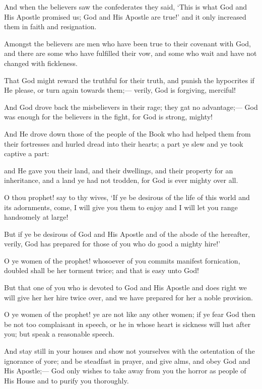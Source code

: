 \documentclass[fontsize=14pt, letterpaper, notitlepage, openany, DIV=12]{scrbook} %
\begin{document}
\noindent[33:22]
And when the believers saw the confederates they said, `This is what God and His
Apostle promised us; God and His Apostle are true!' and it only increased them in faith and
resignation.

\noindent[33:23]
Amongst the believers are men who have been true to their covenant with God, and there
are some who have fulfilled their vow, and some who wait and have not changed with fickleness.

\noindent[33:24]
That God might reward the truthful for their truth, and punish the hypocrites if He please,
or turn again towards them;--- verily, God is forgiving, merciful!

\noindent[33:25]
And God drove back the misbelievers in their rage; they gat no advantage;--- God was
enough for the believers in the fight, for God is strong, mighty!

\noindent[33:26]
And He drove down those of the people of the Book who had helped them from their
fortresses and hurled dread into their hearts; a part ye slew and ye took captive a part:

\noindent[33:27]
and He gave you their land, and their dwellings, and their property for an inheritance, and
a land ye had not trodden, for God is ever mighty over all.

\noindent[33:28]
O thou prophet! say to thy wives, `If ye be desirous of the life of this world and its
adornments, come, I will give you them to enjoy and I will let you range handsomely at large!

\noindent[33:29]
But if ye be desirous of God and His Apostle and of the abode of the hereafter, verily,
God has prepared for those of you who do good a mighty hire!'

\noindent[33:30]
O ye women of the prophet! whosoever of you commits manifest fornication, doubled
shall be her torment twice; and that is easy unto God!

\noindent[33:31]
But that one of you who is devoted to God and His Apostle and does right we will give
her her hire twice over, and we have prepared for her a noble provision.

\noindent[33:32]
O ye women of the prophet! ye are not like any other women; if ye fear God then be not
too complaisant in speech, or he in whose heart is sickness will lust after you; but speak a
reasonable speech.

\noindent[33:33]
And stay still in your houses and show not yourselves with the ostentation of the
ignorance of yore; and be steadfast in prayer, and give alms, and obey God and His Apostle;---
God only wishes to take away from you the horror as people of His House and to purify you
thoroughly.
\end{document}
